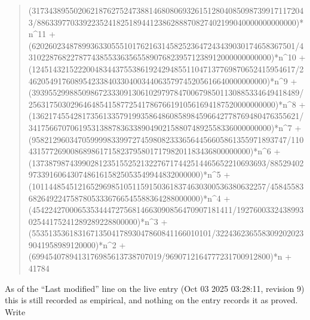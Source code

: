 \documentclass[11pt,a4paper]{article}
\theoremstyle{plain}
\theoremstyle{definition}
\begin{document}
\begin{quote}
(317343895502062187627524738814680806932615128040850987399171172043/88633977033922352418251894412386288870827402199040000000000000)*n\^{}11 + (620260234878993633055510176216314582523647243439030174658367501/43102287682278774385533635655890768239571238912000000000000)*n\^{}10 + (124514321522200483443755386192429485511047137769870652415954617/2462054917608954233840330400344063579745205616640000000000)*n\^{}9 + (3939552998850986723330913061029797847006798501130885334649418489/25631750302964648541587725417867661910561694187520000000000)*n\^{}8 + (1362174554281735613357919935864860858984596642778769480476355621/3417566707061953138878363389049021588074892558336000000000)*n\^{}7 + (9582129603470599998339972745980823336564456605861355971893747/11043157726900868986171582379580171798201183436800000000)*n\^{}6 + (13738798743990281235155252132276717442514465652210693693/8852940297339160643074861615825053549944832000000)*n\^{}5 + (10114485451216529698510511591503618374630300536380632257/4584558368264922475878053336766545588364288000000)*n\^{}4 + (454224270006535344472756814663090856470907181411/192760033243899302544175241289289228800000)*n\^{}3 + (5535135361831671350417893047860841166010101/3224362365583092020239041958989120000)*n\^{}2 + (6994540789413176985613738707019/9690712164777231700912800)*n + 41784
\end{quote}
As of the ``Last modified'' line on the live entry (Oct 03 2025 03:28:11, revision 9) this is still
recorded as empirical, and nothing on the entry records it as proved. Write
\end{document}
